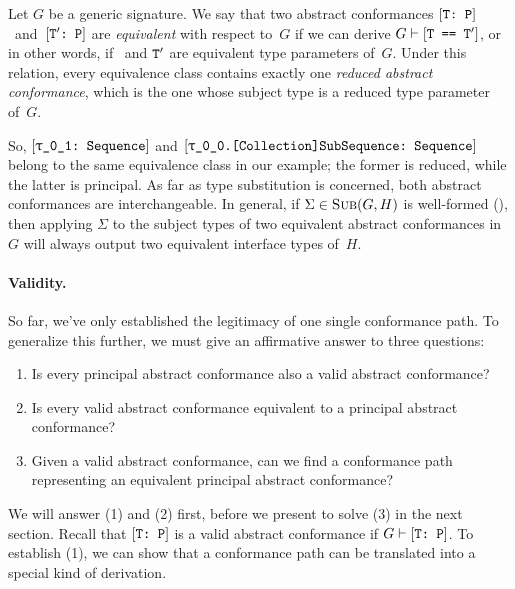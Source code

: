 \documentclass[../generics]{subfiles}
\begin{document}
\begin{definition}
Let $G$ be a generic signature. We say that two abstract conformances $[\texttt{T:~P}]$~and~$[\texttt{$\texttt{T}^\prime$:~P}]$ are \emph{equivalent} with respect to~$G$ if we can derive $G\vdash[\texttt{T == $\texttt{T}^\prime$}]$, or in other words, if \tT\ and $\texttt{T}^\prime$ are equivalent type parameters of~$G$. Under this relation, every equivalence class contains exactly one \emph{reduced abstract conformance}, which is the one whose subject type is a reduced type parameter of~$G$.
\end{definition}

So, $\ConfReq{\rU}{Sequence}$ and $\ConfReq{\rT.[Collection]SubSequence}{Sequence}$ belong to the same equivalence class in our example; the former is reduced, while the latter is principal. As far as type substitution is concerned, both abstract conformances are interchangeable. In general, if $\Sigma\in\textsc{Sub}({G, H})$ is well-formed (), then applying $\Sigma$ to the subject types of two equivalent abstract conformances in~$G$ will always output two equivalent interface types of~$H$.

\paragraph{Validity.} So far, we've only established the legitimacy of one single conformance path. To generalize this further, we must give an affirmative answer to three questions:
\begin{enumerate}
\item Is every principal abstract conformance also a valid abstract conformance?
\item Is every valid abstract conformance equivalent to a principal abstract conformance?
\item Given a valid abstract conformance, can we find a conformance path representing an equivalent principal abstract conformance?
\end{enumerate}
We will answer (1) and (2) first, before we present  to solve (3) in the next section. Recall that $[\texttt{T:~P}]$ is a valid abstract conformance if $G\vdash[\texttt{T:~P}]$. To establish (1), we can show that a conformance path can be translated into a special kind of derivation.
\end{document}
